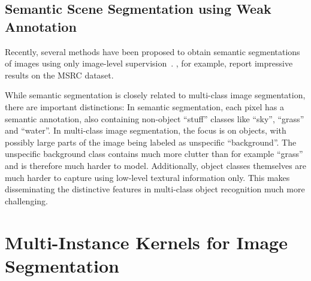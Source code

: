 

\subsection{Semantic Scene Segmentation using Weak Annotation }
Recently, several methods have been proposed to obtain semantic segmentations
of images using only image-level
supervision~\citep{vezhnevets2011weakly,verbeek2007region,vezhnevets2010towards}.
\citet{vezhnevets2011weakly}, for example, report impressive results on the
MSRC dataset.

While semantic segmentation is closely related to multi-class image
segmentation, there are important distinctions: In semantic segmentation, each
pixel has a semantic annotation, also containing non-object ``stuff'' classes like
``sky'', ``grass'' and ``water''. In multi-class image segmentation, the focus
is on objects, with possibly large parts of the image being labeled as
unspecific ``background''.  The unspecific background class contains much more
clutter than for example ``grass'' and is therefore much harder to model. Additionally,
object classes themselves are much harder to capture using low-level textural information only.
This makes disseminating the distinctive features in multi-class object recognition
much more challenging.


\section{Multi-Instance Kernels for Image Segmentation}
